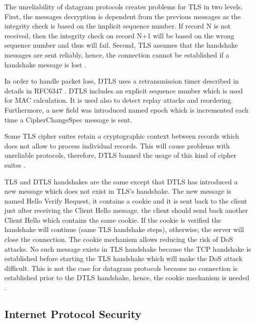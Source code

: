 The unreliability of datagram protocols creates problems for \ac{TLS} in two levels.
First, the messages decryption is dependent from the previous messages as the integrity check is based on the
implicit sequence number. If record N is not received, then the integrity check
on record N+1 will be based on the wrong sequence number and
thus will fail. Second, \ac{TLS} assumes that the handshake messages are sent reliably, hence,
the connection cannot be established if a handshake message is lost \cite{rfc5246}.

In order to handle packet loss, \ac{DTLS} uses a retransmission timer described in details in RFC6347 \cite{rfc6347}.
\ac{DTLS} includes an explicit sequence number which is used
for MAC calculation. It is used also to detect replay attacks and reordering. Furthermore, a new field was introduced named epoch which is incremented each time a CipherChangeSpec
message is sent.

Some \ac{TLS} cipher suites retain a cryptographic context between records which
does not allow to process individual records. This will cause problems with
unreliable protocols, therefore, \ac{DTLS} banned the usage of this kind of cipher suites \cite{rfc5246}.

\ac{TLS} and \ac{DTLS} handshakes are the same except that \ac{DTLS} has introduced a new message which does not
exist in \ac{TLS}'s handshake. The new message is named Hello Verify Request, it contains a cookie and it is sent back
to the client just after receiving the Client Hello message. the client should send back another Client Hello
which contains the same cookie. If the cookie is verified the handshake will continue (same \ac{TLS} handshake steps), otherwise,
the server will close the connection. The cookie mechanism allows reducing the risk of \ac{DoS} attacks.
No such message exists in \ac{TLS} handshake because the \ac{TCP}   handshake is established before starting the \ac{TLS} handshake
which will make the DoS attack difficult. This is not the case for datagram protocols because no connection is established prior to
the \ac{DTLS} handshake, hence, the cookie mechanism is needed \cite{rfc6347}.

\subsection{Internet Protocol Security}

